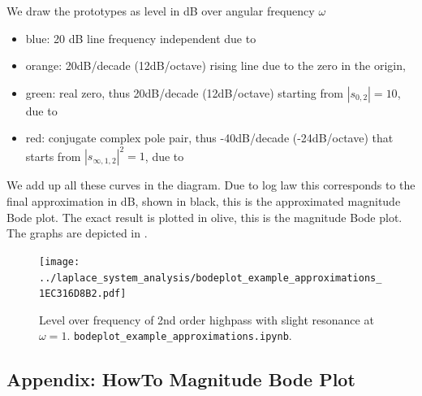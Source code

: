 \begin{Loesung}
We draw the prototypes as level in dB over angular frequency $\omega$
\begin{itemize}
\item blue: 20 dB line frequency independent due to 
\item orange: 20dB/decade (12dB/octave) rising line due to the zero in the origin,
\item green: real zero, thus 20dB/decade (12dB/octave) starting from $|s_{0,2}| = 10$, due to
\item red: conjugate complex pole pair, thus -40dB/decade (-24dB/octave) that starts from
$|s_{\infty,1,2}|^2 = 1$, due to 
\end{itemize}
We add up all these curves in the diagram. Due to log law this corresponds to the final approximation
in dB, shown in black, this is the approximated magnitude Bode plot.
The exact result is plotted in olive, this is the magnitude Bode plot.
The graphs are depicted in .
\end{Loesung}

\begin{figure}[h!]
\centering
\texttt{[image: ../laplace\_system\_analysis/bodeplot\_example\_approximations\_1EC316D8B2.pdf]}
\caption{Level over frequency of 2nd order highpass with slight resonance
at $\omega=1$. \texttt{bodeplot\_example\_approximations.ipynb}.}
\label{fig:bodeplot_example_approximations_1EC316D8B2}
\end{figure}



















\clearpage
\subsection{Appendix: HowTo Magnitude Bode Plot}
